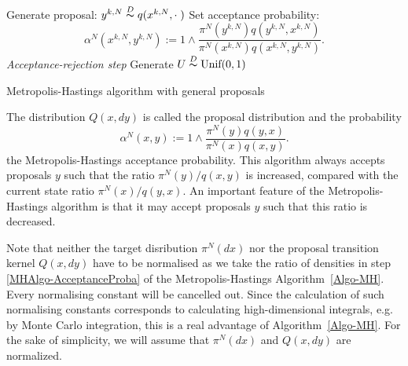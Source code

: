 \IncMargin{1em}
\begin{algorithm}[htb]
\DontPrintSemicolon


\BlankLine

{
  Generate proposal: $ y^{k,N} \stackrel{D}{\thicksim} q(x^{k,N}, \cdot \;) $\;
  Set acceptance probability:
  \begin{equation*}
   \alpha^{N} ( x^{k,N}, y^{k,N} ) := 1 \wedge \dfrac{\pi^{N}(y^{k,N}) q(y^{k,N},x^{k,N}) }{\pi^{N}(x^{k,N}) q(x^{k,N},y^{k,N})}.    
  \end{equation*}\label{MHAlgo-AcceptanceProba}
  \emph{Acceptance-rejection step}\;
  Generate $ U \stackrel{D}{\thicksim} \text{Unif}(0,1) $\;

}
\caption{Metropolis-Hastings algorithm with general proposals}\label{Algo-MH}
\end{algorithm}\DecMargin{1em}

The distribution $ Q(x,dy) $ is called the proposal distribution and the probability 
\begin{equation}
 \label{MH-Acceptance probability definition}
 \alpha^{N}(x,y)  := 1 \wedge \dfrac{\pi^{N}(y) q(y,x) }{\pi^{N}(x) q(x,y)}.
\end{equation}
 the Metropolis-Hastings acceptance probability. This algorithm always accepts proposals $y$ such that the ratio $ \pi^{N}(y) / q(x,y) $ is increased, compared with the current state ratio $ \pi^{N}(x) / q(y,x) $. An important feature of the Metropolis-Hastings algorithm is that it may accept proposals $y$ such that this ratio is decreased.

\begin{rem}
\label{Rem-Omitting constants in densities}
 Note that neither the target disribution $ \pi^{N}(dx) $ nor the proposal transition kernel $ Q(x,dy) $ have to be normalised as we take the ratio of densities in step \ref{MHAlgo-AcceptanceProba} of the Metropolis-Hastings Algorithm~\ref{Algo-MH}. Every normalising constant will be cancelled out. Since the calculation of such normalising constants corresponds to calculating high-dimensional integrals, e.g. by Monte Carlo integration, this is a real advantage of Algorithm~\ref{Algo-MH}. For the sake of simplicity, we will assume that $ \pi^{N}(dx) $ and $ Q(x,dy) $ are normalized.
\end{rem}

